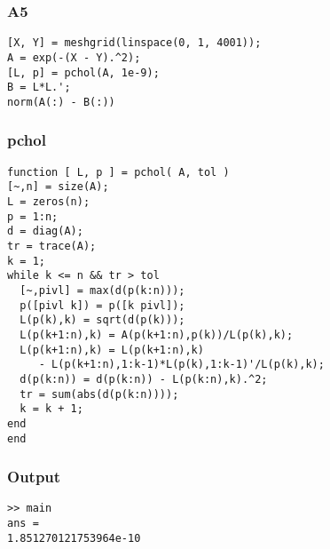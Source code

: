 \documentclass[ngerman,12pt]{article}
\begin{document}
\lstset{language=Matlab,basicstyle=\ttfamily,columns=fixed}
\subsubsection*{A5}
\begin{lstlisting}[frame=single]
[X, Y] = meshgrid(linspace(0, 1, 4001));
A = exp(-(X - Y).^2);
[L, p] = pchol(A, 1e-9);
B = L*L.';
norm(A(:) - B(:))
\end{lstlisting}


\subsubsection*{pchol}
\begin{lstlisting}[frame=single]
function [ L, p ] = pchol( A, tol )
[~,n] = size(A);
L = zeros(n);
p = 1:n;
d = diag(A);
tr = trace(A);
k = 1;
while k <= n && tr > tol
  [~,pivl] = max(d(p(k:n)));
  p([pivl k]) = p([k pivl]);
  L(p(k),k) = sqrt(d(p(k)));
  L(p(k+1:n),k) = A(p(k+1:n),p(k))/L(p(k),k);
  L(p(k+1:n),k) = L(p(k+1:n),k)
     - L(p(k+1:n),1:k-1)*L(p(k),1:k-1)'/L(p(k),k);
  d(p(k:n)) = d(p(k:n)) - L(p(k:n),k).^2;
  tr = sum(abs(d(p(k:n))));
  k = k + 1;
end
end
\end{lstlisting}
\subsubsection*{Output}
\begin{lstlisting}[frame=single]
>> main
ans =
1.851270121753964e-10
\end{lstlisting}
\end{document}
